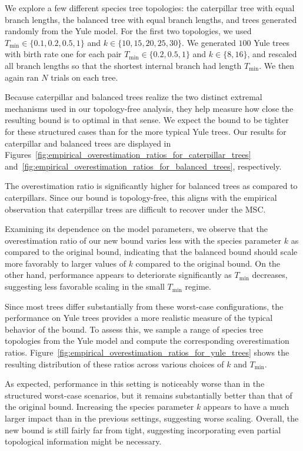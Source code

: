 We explore a few different species tree topologies: the caterpillar
tree with equal branch lengths, the balanced tree with equal branch
lengths, and trees generated randomly from the Yule model. For the
first two topologies, we used $T_{\mathrm{min}}\in\{0.1,0.2,0.5,1\}$
and $k\in\{10,15,20,25,30\}$. We generated $100$ Yule trees with birth rate one for each pair
$T_{\mathrm{min}}\in\{0.2,0.5,1\}$ and $k\in\{8,16\}$, and rescaled all branch lengths
so that the shortest internal branch had length $T_{\mathrm{min}}$. We then again
ran $N$ trials on each tree.

Because caterpillar and balanced trees realize the two distinct extremal mechanisms used in our
topology-free analysis, they help measure how close the resulting bound is to optimal in that
sense. We expect the bound to be tighter for these structured cases than for the more typical
Yule trees. Our results for caterpillar and balanced trees are displayed in
Figures~\ref{fig:empirical_overestimation_ratios_for_caterpillar_trees}
and~\ref{fig:empirical_overestimation_ratios_for_balanced_trees}, respectively.

The overestimation
ratio is significantly higher for balanced trees as compared to caterpillars. Since our bound
is topology-free, this aligns with the empirical observation that caterpillar trees are difficult
to recover under the MSC.

Examining its dependence on the model parameters, we observe that the overestimation ratio of
our new bound varies less with the species parameter $k$ as compared to the original bound,
indicating that the balanced bound should scale more favorably to larger values of $k$ compared
 to the original bound. On the other hand, performance appears to deteriorate significantly as
$T_{\mathrm{min}}$ decreases, suggesting less favorable scaling in the small $T_{\mathrm{min}}$
regime.


Since most trees differ substantially from these worst-case configurations, the performance
on Yule trees provides a more realistic measure of the typical behavior of the bound. To assess
this, we sample a range of species tree topologies from the Yule model and compute the
corresponding overestimation ratios. Figure~\ref{fig:empirical_overestimation_ratios_for_yule_trees}
shows the resulting distribution of these ratios across various choices of $k$ and $T_{\min}$.

As expected, performance in this setting is noticeably worse than in the structured worst-case
scenarios, but it remains substantially better than that of the original bound. Increasing the
species parameter $k$ appears to have a much larger impact than in the previous settings,
suggesting worse scaling. Overall, the new bound is still fairly far from tight, suggesting
incorporating even partial topological information might be necessary.


